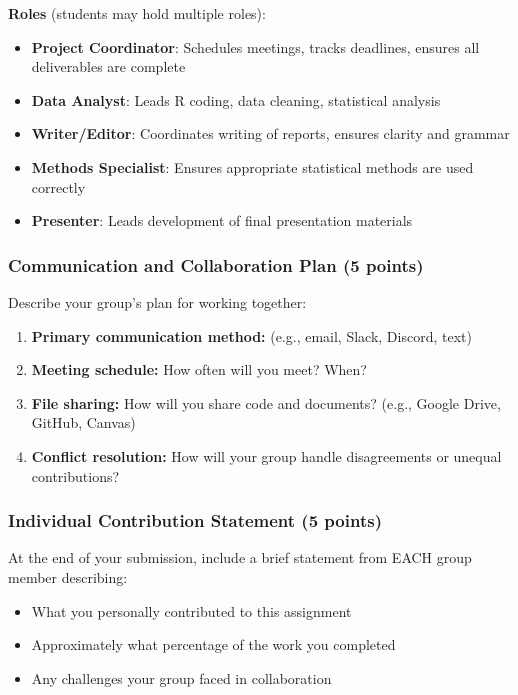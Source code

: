 \documentclass[11pt]{article}
\begin{document}
\textbf{Roles} (students may hold multiple roles):
\begin{itemize}
\item \textbf{Project Coordinator}: Schedules meetings, tracks deadlines, ensures all deliverables are complete
\item \textbf{Data Analyst}: Leads R coding, data cleaning, statistical analysis
\item \textbf{Writer/Editor}: Coordinates writing of reports, ensures clarity and grammar
\item \textbf{Methods Specialist}: Ensures appropriate statistical methods are used correctly
\item \textbf{Presenter}: Leads development of final presentation materials
\end{itemize}

\subsubsection{Communication and Collaboration Plan (5 points)}

Describe your group's plan for working together:

\begin{enumerate}[label=\alph*)]
\item \textbf{Primary communication method:} (e.g., email, Slack, Discord, text)
\item \textbf{Meeting schedule:} How often will you meet? When?
\item \textbf{File sharing:} How will you share code and documents? (e.g., Google Drive, GitHub, Canvas)
\item \textbf{Conflict resolution:} How will your group handle disagreements or unequal contributions?
\end{enumerate}

\subsubsection{Individual Contribution Statement (5 points)}

At the end of your submission, include a brief statement from EACH group member describing:
\begin{itemize}
\item What you personally contributed to this assignment
\item Approximately what percentage of the work you completed
\item Any challenges your group faced in collaboration
\end{itemize}
\end{document}
